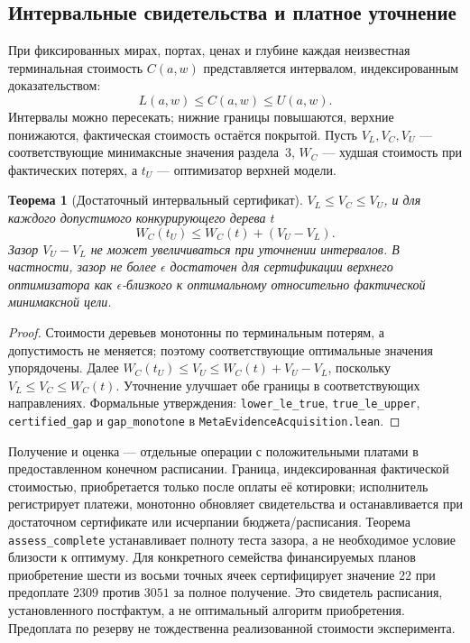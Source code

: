 \documentclass[10pt,a4paper]{article}
\newtheorem{theorem}{Теорема}[section]
\newcommand{\rc}[1]{\allowbreak\texttt{#1}\allowbreak}
\begin{document}
\subsection{Интервальные свидетельства и платное уточнение}
При фиксированных мирах, портах, ценах и глубине каждая неизвестная терминальная стоимость $C(a,w)$ представляется интервалом, индексированным доказательством:
\[
  L(a,w)\le C(a,w)\le U(a,w).
\]
Интервалы можно пересекать; нижние границы повышаются, верхние понижаются, фактическая стоимость остаётся покрытой. Пусть $V_L,V_C,V_U$ --- соответствующие минимаксные значения раздела~3, $W_C$ --- худшая стоимость при фактических потерях, а $t_U$ --- оптимизатор верхней модели.
\begin{theorem}[Достаточный интервальный сертификат]\label{thm:interval}
$V_L\le V_C\le V_U$, и для каждого допустимого конкурирующего дерева $t$
\[
 W_C(t_U)\le W_C(t)+(V_U-V_L).
\]
Зазор $V_U-V_L$ не может увеличиваться при уточнении интервалов. В частности, зазор не более $\epsilon$ достаточен для сертификации верхнего оптимизатора как $\epsilon$-близкого к оптимальному относительно фактической минимаксной цели.
\end{theorem}
\begin{proof}
Стоимости деревьев монотонны по терминальным потерям, а допустимость не меняется; поэтому соответствующие оптимальные значения упорядочены. Далее $W_C(t_U)\le V_U\le W_C(t)+V_U-V_L$, поскольку $V_L\le V_C\le W_C(t)$. Уточнение улучшает обе границы в соответствующих направлениях. Формальные утверждения: \rc{lower\_le\_true}, \rc{true\_le\_upper}, \rc{certified\_gap} и \rc{gap\_monotone} в \rc{MetaEvidenceAcquisition.lean}.
\end{proof}
Получение и оценка --- отдельные операции с положительными платами в предоставленном конечном расписании. Граница, индексированная фактической стоимостью, приобретается только после оплаты её котировки; исполнитель регистрирует платежи, монотонно обновляет свидетельства и останавливается при достаточном сертификате или исчерпании бюджета/расписания. Теорема \rc{assess\_complete} устанавливает полноту теста зазора, а не необходимое условие близости к оптимуму. Для конкретного семейства финансируемых планов приобретение шести из восьми точных ячеек сертифицирует значение $22$ при предоплате $2309$ против $3051$ за полное получение. Это свидетель расписания, установленного постфактум, а не оптимальный алгоритм приобретения. Предоплата по резерву не тождественна реализованной стоимости эксперимента.
\end{document}
